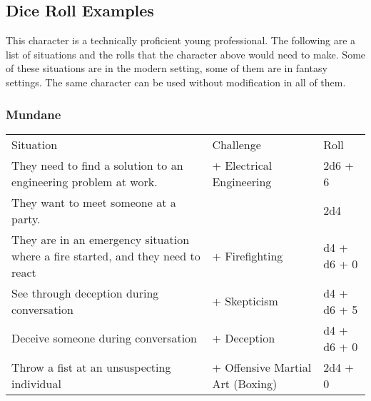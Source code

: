 \documentclass{LegrandOrangeTufteBook}
\begin{document}
\begin{characterSheet}



\end{characterSheet}


\subsection*{Dice Roll Examples}

This character is a technically proficient young professional. The following are a list of situations and the rolls that the character above would need to make.
Some of these situations are in the modern setting, some of them are in fantasy settings. The same character can be used without modification in all of them.

\subsubsection*{Mundane}

\begin{center}
	\begin{xltabular}{\textwidth}{Xll}
				Situation												& Challenge 								& Roll \\
	They need to find a solution to an engineering problem at work.				&  + Electrical Engineering		& 2d6 + 6 \\
				They want to meet someone at a party.								& 					& 2d4 \\
	They are in an emergency situation where a fire started, and they need to react	&  + Firefighting 		& d4 + d6 + 0 \\
		 		See through deception during conversation							&  + Skepticism				& d4 + d6 + 5 \\
	Deceive someone during conversation 								&  + Deception			& d4 + d6 + 0 \\
		 		Throw a fist at an unsuspecting individual							&  + Offensive Martial Art (Boxing)	& 2d4 + 0 \\
	\end{xltabular}
\end{center}
\end{document}
